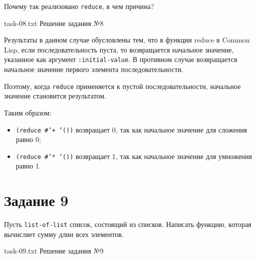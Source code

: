 Почему так реализовано \texttt{reduce}, в чем причина?

{task-08.txt} %
{Решение задания №8} %

Результаты в данном случае обусловлены тем, что в функции reduce в Common Lisp, если последовательность пуста, то возвращается начальное значение, указанное как аргумент \texttt{:initial-value}. 
В противном случае возвращается начальное значение первого элемента последовательности.

Поэтому, когда \texttt{reduce} применяется к пустой последовательности, начальное значение становится результатом. 

Таким образом:
\begin{itemize}
	\item \texttt{(reduce \#'+ '())} возвращает 0, так как начальное значение для сложения равно 0;
	\item \texttt{(reduce \#'* '())} возвращает 1, так как начальное значение для умножения равно 1.
\end{itemize}


\section{Задание 9}

Пусть \texttt{list-of-list} список, состоящий из списков. Написать функцию, которая вычисляет сумму длин всех элементов.

{task-09.txt} %
{Решение задания №9} %